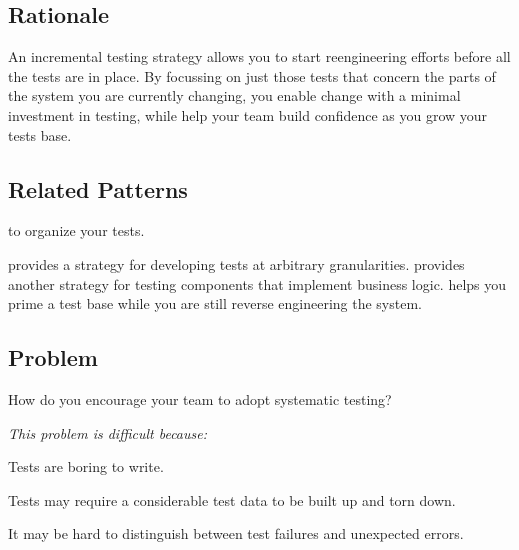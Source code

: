 \documentclass[a4paper,10pt,twoside]{book}
\begin{document}
\subsection*{Rationale}

An incremental testing strategy allows you to start reengineering efforts before all the tests are in place. By focussing on just those tests that concern the parts of the system you are currently changing, you enable change with a minimal investment in testing, while help your team build confidence as you grow your tests base.

\subsection*{Related Patterns}

 to organize your tests. 

 provides a strategy for developing tests at arbitrary granularities.  provides another strategy for testing components that implement business logic.  helps you prime a test base while you are still reverse engineering the system.



\subsection*{Problem}

How do you encourage your team to adopt systematic testing?

\emph{This problem is difficult because:} 

\begin{bulletlist}
\item Tests are boring to write.
\item Tests may require a considerable test data to be built up and torn down.
\item It may be hard to distinguish between test failures and unexpected errors.
\end{bulletlist}
\end{document}
